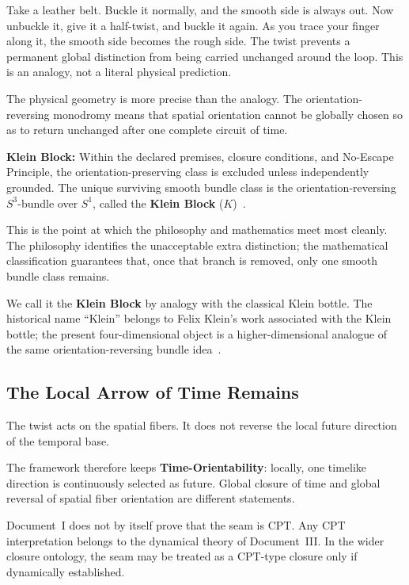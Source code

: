 \documentclass[11pt]{article}
\theoremstyle{canonstyle}
\providecommand{\Klein}{\mathcal{K}}
\def\mathcal#1{#1}%
\begin{document}
Take a leather belt. Buckle it normally, and the smooth side is always out. Now unbuckle it, give it a half-twist, and buckle it again. As you trace your finger along it, the smooth side becomes the rough side. The twist prevents a permanent global distinction from being carried unchanged around the loop. This is an analogy, not a literal physical prediction.

The physical geometry is more precise than the analogy. The orientation-reversing monodromy means that spatial orientation cannot be globally chosen so as to return unchanged after one complete circuit of time.

\begin{keyresult}
\textbf{Klein Block:} Within the declared premises, closure conditions, and No-Escape Principle, the orientation-preserving class is excluded unless independently grounded. The unique surviving smooth bundle class is the orientation-reversing $S^3$-bundle over $S^1$, called the \textbf{Klein Block} ($\Klein$)~\cite{CanonWhat}.
\end{keyresult}

This is the point at which the philosophy and mathematics meet most cleanly. The philosophy identifies the unacceptable extra distinction; the mathematical classification guarantees that, once that branch is removed, only one smooth bundle class remains.

\begin{forthecurious}
We call it the \textbf{Klein Block} by analogy with the classical Klein bottle. The historical name ``Klein'' belongs to Felix Klein's work associated with the Klein bottle; the present four-dimensional object is a higher-dimensional analogue of the same orientation-reversing bundle idea~\cite{Klein}.
\end{forthecurious}

\subsection{The Local Arrow of Time Remains}

The twist acts on the spatial fibers. It does not reverse the local future direction of the temporal base.

The framework therefore keeps \textbf{Time-Orientability}: locally, one timelike direction is continuously selected as future. Global closure of time and global reversal of spatial fiber orientation are different statements.

\begin{forthecurious}
Document~I does not by itself prove that the seam is CPT. Any CPT interpretation belongs to the dynamical theory of Document~III. In the wider closure ontology, the seam may be treated as a CPT-type closure only if dynamically established.
\end{forthecurious}
\end{document}
